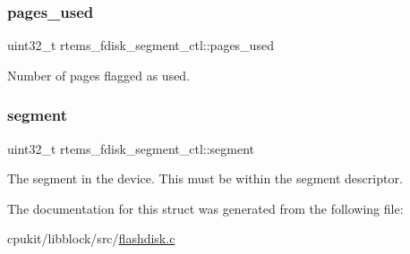 \subsubsection{\texorpdfstring{pages\_used}{pages\_used}}
{\footnotesize\ttfamily uint32\+\_\+t rtems\+\_\+fdisk\+\_\+segment\+\_\+ctl\+::pages\+\_\+used}

Number of pages flagged as used. \mbox{\label{structrtems__fdisk__segment__ctl_a02c1c94b6a9227a8a1275740cadd99cd}} 
\subsubsection{\texorpdfstring{segment}{segment}}
{\footnotesize\ttfamily uint32\+\_\+t rtems\+\_\+fdisk\+\_\+segment\+\_\+ctl\+::segment}

The segment in the device. This must be within the segment descriptor. 

The documentation for this struct was generated from the following file\+:\begin{DoxyCompactItemize}
\item 
cpukit/libblock/src/\mbox{\hyperlink{flashdisk_8c}{flashdisk.\+c}}\end{DoxyCompactItemize}
